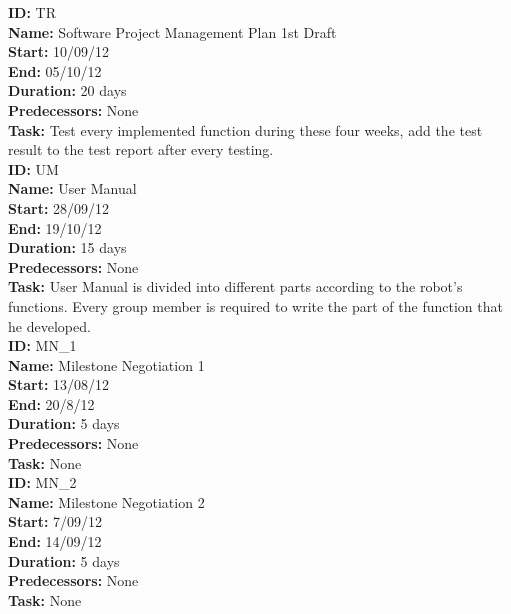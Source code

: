 \documentclass[11pt, a4paper]{report}
\begin{document}
\noindent \textbf{ID:} TR \\
\noindent \textbf{Name:} Software Project Management Plan 1st Draft\\
\noindent \textbf{Start:} 10/09/12 \\
\noindent \textbf{End:} 05/10/12 \\
\noindent \textbf{Duration:} 20 days \\
\noindent \textbf{Predecessors:} None \\
\noindent \textbf{Task:} Test every implemented function during these four weeks, add the test result to the test report after every testing.\\[0.5cm]

\noindent \textbf{ID:} UM \\
\noindent \textbf{Name:} User Manual \\
\noindent \textbf{Start:} 28/09/12 \\
\noindent \textbf{End:} 19/10/12 \\
\noindent \textbf{Duration:} 15 days \\
\noindent \textbf{Predecessors:} None \\
\noindent \textbf{Task:} User Manual is divided into different parts according to the robot's functions. Every group member is required to write the part of the function that he developed.\\[0.5cm]

\noindent \textbf{ID:} MN_1 \\
\noindent \textbf{Name:} Milestone Negotiation 1 \\
\noindent \textbf{Start:} 13/08/12 \\
\noindent \textbf{End:} 20/8/12 \\
\noindent \textbf{Duration:} 5 days \\
\noindent \textbf{Predecessors:} None \\
\noindent \textbf{Task:} None\\[0.5cm]

\noindent \textbf{ID:} MN_2 \\
\noindent \textbf{Name:} Milestone Negotiation 2 \\
\noindent \textbf{Start:} 7/09/12 \\
\noindent \textbf{End:} 14/09/12 \\
\noindent \textbf{Duration:} 5 days \\
\noindent \textbf{Predecessors:} None \\
\noindent \textbf{Task:} None\\[0.5cm]
\end{document}
